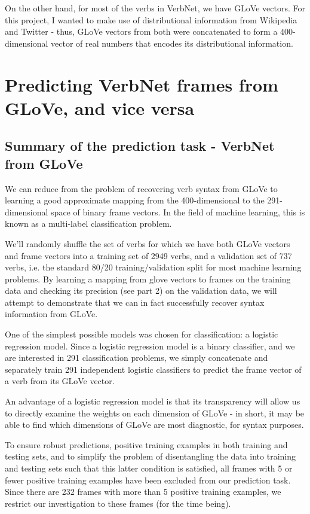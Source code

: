 \documentclass[11pt,a4paper]{article}
\begin{document}
On the other hand, for most of the verbs in VerbNet, we have GLoVe vectors. For this project, I wanted to make use of distributional information from Wikipedia and Twitter - thus, GLoVe vectors from both were concatenated to form a 400-dimensional vector of real numbers that encodes its distributional information. 

\section{Predicting VerbNet frames from GLoVe, and vice versa}

\subsection{Summary of the prediction task - VerbNet from GLoVe}

We can reduce from the problem of recovering verb syntax from GLoVe to learning a good approximate mapping from the 400-dimensional to the 291-dimensional space of binary frame vectors. In the field of machine learning, this is known as a multi-label classification problem.

We’ll randomly shuffle the set of verbs for which we have both GLoVe vectors and frame vectors into a training set of 2949 verbs, and a validation set of 737 verbs, i.e. the standard 80/20 training/validation split for most machine learning problems. By learning a mapping from glove vectors to frames on the training data and checking its precision (see part 2) on the validation data, we will attempt to demonstrate that we can in fact successfully recover syntax information from GLoVe.

One of the simplest possible models was chosen for classification: a logistic regression model. Since a logistic regression model is a binary classifier, and we are interested in 291 classification problems, we simply concatenate and separately train 291 independent logistic classifiers to predict the frame vector of a verb from its GLoVe vector.

An advantage of a logistic regression model is that its transparency will allow us to directly examine the weights on each dimension of GLoVe - in short, it may be able to find which dimensions of GLoVe are most diagnostic, for syntax purposes.

To ensure robust predictions, positive training examples in both training and testing sets, and to simplify the problem of disentangling the data into training and testing sets such that this latter condition is satisfied, all frames with 5 or fewer positive training examples have been excluded from our prediction task. Since there are 232 frames with more than 5 positive training examples, we restrict our investigation to these frames (for the time being).
\end{document}
